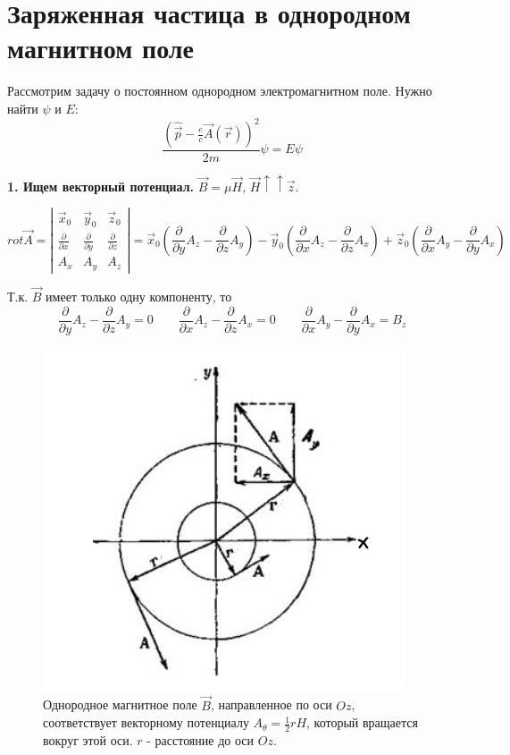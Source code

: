 \newpage
\chapter{Заряженная частица в однородном магнитном поле}
\par  Рассмотрим задачу о постоянном однородном электромагнитном поле. Нужно найти $\psi$ и $E$:
$$\frac{\left(\hat{\vec{p}} - \frac{e}{c} \vec{A}(\vec{r}) \right)^2}{2m}  \psi = E \psi$$
\par \textbf{1. Ищем векторный потенциал.} $\vec{B}= \mu \vec{H}$, $\vec{H} \uparrow \uparrow \vec{z}$.
\par
$$rot \vec{A} = \left |\begin{matrix} \vec{x}_0 & \vec{y}_0 &\vec{z}_0  \\ \frac{\partial}{\partial x} & \frac{\partial}{\partial y} &\frac{\partial}{\partial z} \\ A_x & A_y & A_z \end{matrix} \right| = \vec{x}_0 \left(\frac{\partial}{\partial y}A_z - \frac{\partial}{\partial z} A_y\right) -  \vec{y}_0 \left(\frac{\partial}{\partial x} A_z - \frac{\partial}{\partial z}A_x  \right) + \vec{z}_0 \left(\frac{\partial}{\partial x}A_y -  \frac{\partial}{\partial y}A_x   \right) $$
\par Т.к. $\vec{B}$ имеет только одну компоненту, то $$\frac{\partial}{\partial y}A_z - \frac{\partial}{\partial z} A_y = 0 \qquad \frac{\partial}{\partial x} A_z - \frac{\partial}{\partial z}A_x  = 0 \qquad \frac{\partial}{\partial x}A_y -  \frac{\partial}{\partial y}A_x  = B_z$$
\par 
\begin{figure} 
\vspace{-2ex}
\centering
\includegraphics[width=1\linewidth]{pictures/30.1.jpg}
\caption{Однородное магнитное поле $\vec{B}$, направленное по оси $Oz$, соответствует векторному потенциалу $A_{\theta}= \frac{1}{2} rH$, который вращается вокруг этой оси. $r$ - расстояние до оси $Oz$.}
\end{figure}
